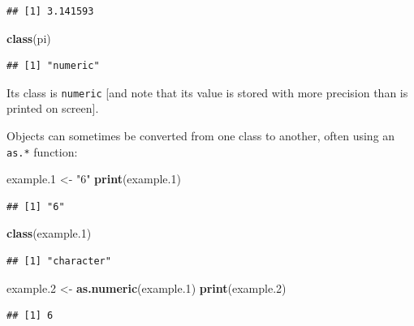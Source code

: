 \documentclass[]{article}
\newenvironment{Shaded}{\begin{snugshade}}{\end{snugshade}}
\newcommand{\FloatTok}[1]{\textcolor[rgb]{0.00,0.00,0.81}{#1}}
\newcommand{\KeywordTok}[1]{\textcolor[rgb]{0.13,0.29,0.53}{\textbf{#1}}}
\newcommand{\NormalTok}[1]{#1}
\newcommand{\StringTok}[1]{\textcolor[rgb]{0.31,0.60,0.02}{#1}}
\theoremstyle{definition}
\theoremstyle{definition}
\theoremstyle{definition}
\theoremstyle{remark}
\begin{document}
\begin{verbatim}
## [1] 3.141593
\end{verbatim}

\begin{Shaded}
\begin{Highlighting}[]
\KeywordTok{class}\NormalTok{(pi)}
\end{Highlighting}
\end{Shaded}

\begin{verbatim}
## [1] "numeric"
\end{verbatim}

Its class is \texttt{numeric} {[}and note that its value is stored with
more precision than is printed on screen{]}.

Objects can sometimes be converted from one class to another, often
using an \texttt{as.*} function:

\begin{Shaded}
\begin{Highlighting}[]
\NormalTok{example}\FloatTok{.1}\NormalTok{ <-}\StringTok{ "6"}
\KeywordTok{print}\NormalTok{(example}\FloatTok{.1}\NormalTok{)}
\end{Highlighting}
\end{Shaded}

\begin{verbatim}
## [1] "6"
\end{verbatim}

\begin{Shaded}
\begin{Highlighting}[]
\KeywordTok{class}\NormalTok{(example}\FloatTok{.1}\NormalTok{)}
\end{Highlighting}
\end{Shaded}

\begin{verbatim}
## [1] "character"
\end{verbatim}

\begin{Shaded}
\begin{Highlighting}[]
\NormalTok{example}\FloatTok{.2}\NormalTok{ <-}\StringTok{ }\KeywordTok{as.numeric}\NormalTok{(example}\FloatTok{.1}\NormalTok{)}
\KeywordTok{print}\NormalTok{(example}\FloatTok{.2}\NormalTok{)}
\end{Highlighting}
\end{Shaded}

\begin{verbatim}
## [1] 6
\end{verbatim}
\end{document}
